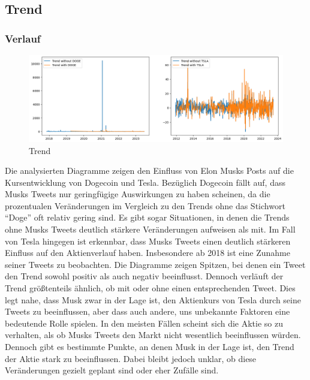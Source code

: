 \documentclass{article}
\begin{document}
\newpage



\subsection{Trend}
\subsubsection{Verlauf}
\begin{figure}[!htb]
  	\includegraphics[width=\textwidth, center]{./imgs/Trend.png}
 	\caption{Trend}
 	\label{fig:Trend}
\end{figure}
Die analysierten Diagramme zeigen den Einfluss von Elon Musks Posts auf die Kursentwicklung von Dogecoin und Tesla. Bezüglich Dogecoin fällt auf, dass Musks Tweets nur geringfügige Auswirkungen zu haben scheinen, da die prozentualen Veränderungen im Vergleich zu den Trends ohne das Stichwort ``Doge'' oft relativ gering sind. Es gibt sogar Situationen, in denen die Trends ohne Musks Tweets deutlich stärkere Veränderungen aufweisen als mit.
Im Fall von Tesla hingegen ist erkennbar, dass Musks Tweets einen deutlich stärkeren Einfluss auf den Aktienverlauf haben. Insbesondere ab 2018 ist eine Zunahme seiner Tweets zu beobachten. Die Diagramme zeigen Spitzen, bei denen ein Tweet den Trend sowohl positiv als auch negativ beeinflusst. Dennoch verläuft der Trend größtenteils ähnlich, ob mit oder ohne einen entsprechenden Tweet. Dies legt nahe, dass Musk zwar in der Lage ist, den Aktienkurs von Tesla durch seine Tweets zu beeinflussen, aber dass auch andere, uns unbekannte Faktoren eine bedeutende Rolle spielen.
In den meisten Fällen scheint sich die Aktie so zu verhalten, als ob Musks Tweets den Markt nicht wesentlich beeinflussen würden. Dennoch gibt es bestimmte Punkte, an denen Musk in der Lage ist, den Trend der Aktie stark zu beeinflussen. Dabei bleibt jedoch unklar, ob diese Veränderungen gezielt geplant sind oder eher Zufälle sind.
\end{document}
